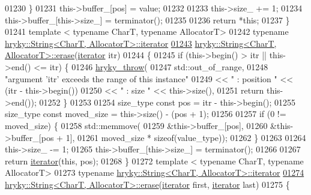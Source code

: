 \begin{DoxyCode}
01230     \}
01231     this->buffer\_[pos] = value;
01232 
01233     this->size\_ += 1;
01234     this->buffer\_[this->size\_] = terminator();
01235     
01236     \textcolor{keywordflow}{return} *\textcolor{keyword}{this};
01237 \}
01241 \textcolor{keyword}{template} < \textcolor{keyword}{typename} CharT, \textcolor{keyword}{typename} AllocatorT>
01242 \textcolor{keyword}{typename} \hyperlink{classhryky_1_1iterator_1_1random_1_1_mutable}{hryky::String<CharT, AllocatorT>::iterator}
\hypertarget{string_8h_source_l01243}{}\hyperlink{classhryky_1_1_string_ab45f3fadb1ffe1fc9fdd1de9e3c87df9}{01243} \hyperlink{classhryky_1_1_string}{hryky::String<CharT, AllocatorT>::erase}(\hyperlink{classhryky_1_1iterator_1_1random_1_1_mutable}{iterator} itr)
01244 \{
01245     \textcolor{keywordflow}{if} (this->begin() > itr || this->end() <= itr) \{
01246         \hyperlink{debug__common_8h_af50606eac4009921527ddcaed392b2c2}{hryky_throw}(
01247             std::out\_of\_range,
01248             \textcolor{stringliteral}{"argument 'itr' exceeds the range of this instance"}
01249             << \textcolor{stringliteral}{" : position "} << (itr - this->begin())
01250             << \textcolor{stringliteral}{" : size "} << this->size(),
01251             \textcolor{keywordflow}{return} this->end());
01252     \}
01253 
01254     size\_type \textcolor{keyword}{const} pos         = itr - this->begin();
01255     size\_type \textcolor{keyword}{const} moved\_size  = this->size() - (pos + 1);
01256 
01257     \textcolor{keywordflow}{if} (0 != moved\_size) \{
01258         std::memmove(
01259             &this->buffer\_[pos],
01260             &this->buffer\_[pos + 1],
01261             moved\_size * \textcolor{keyword}{sizeof}(value\_type));
01262     \}
01263 
01264     this->size\_ -= 1;
01265     this->buffer\_[this->size\_] = terminator();
01266 
01267     \textcolor{keywordflow}{return} \hyperlink{classhryky_1_1iterator_1_1random_1_1_mutable}{iterator}(\textcolor{keyword}{this}, pos);
01268 \}
01272 \textcolor{keyword}{template} < \textcolor{keyword}{typename} CharT, \textcolor{keyword}{typename} AllocatorT>
01273 \textcolor{keyword}{typename} \hyperlink{classhryky_1_1iterator_1_1random_1_1_mutable}{hryky::String<CharT, AllocatorT>::iterator}
\hypertarget{string_8h_source_l01274}{}\hyperlink{classhryky_1_1_string_a1bfe86dd9a32315aeecdbd8f7f198be0}{01274} \hyperlink{classhryky_1_1_string}{hryky::String<CharT, AllocatorT>::erase}(\hyperlink{classhryky_1_1iterator_1_1random_1_1_mutable}{iterator} first, \hyperlink{classhryky_1_1iterator_1_1random_1_1_mutable}{iterator} last)
01275 \{

\end{DoxyCode}
